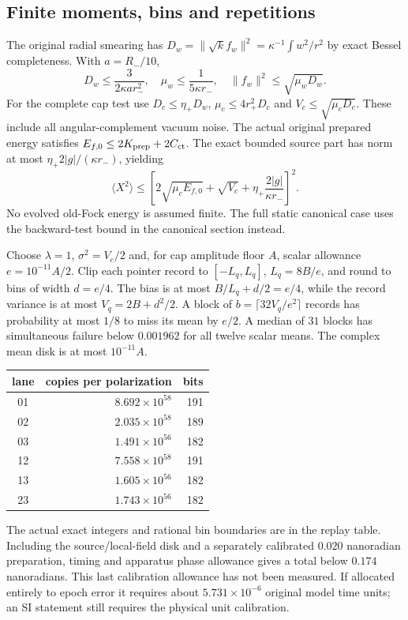 \subsection{Finite moments, bins and repetitions}
The original radial smearing has
$D_w=\|\sqrt{k}f_w\|^2=\kappa^{-1}\int w^2/r^2$
by exact Bessel completeness.  With $a=R_-/10$,
\begin{equation}
 D_w\leq\frac3{2\kappa a r_-^2},\quad
 \mu_w\leq\frac1{5\kappa r_-},\quad
 \|f_w\|^2\leq\sqrt{\mu_wD_w}.
\end{equation}
For the complete cap test use
$D_c\leq\eta_+D_w$, $\mu_c\leq4r_+^2D_c$ and
$V_c\leq\sqrt{\mu_cD_c}$.  These include all angular-complement
vacuum noise.  The actual original prepared energy satisfies
$E_{f,0}\leq2K_{\rm prep}+2C_{\rm ct}$.  The exact bounded source
part has norm at most $\eta_+2|g|/(\kappa r_-)$, yielding
\begin{equation}
 \langle X^2\rangle\leq
 \left[2\sqrt{\mu_cE_{f,0}}+\sqrt{V_c}
       +\eta_+\frac{2|g|}{\kappa r_-}\right]^2.
\end{equation}
No evolved old-Fock energy is assumed finite.  The full static canonical
case uses the backward-test bound in the canonical section instead.

Choose $\lambda=1$, $\sigma^2=V_c/2$ and, for cap amplitude floor
$A$, scalar allowance $e=10^{-11}A/2$.  Clip each pointer record to
$[-L_q,L_q]$, $L_q=8B/e$, and round to bins of width $d=e/4$.
The bias is at most $B/L_q+d/2=e/4$, while the record variance is at most
$V_q=2B+d^2/2$.  A block of $b=\lceil32V_q/e^2\rceil$ records has
probability at most $1/8$ to miss its mean by $e/2$.  A median of $31$
blocks has simultaneous failure below $0.001962$ for all twelve scalar
means.  The complex mean disk is at most $10^{-11}A$.

\begin{center}
\begin{tabular}{c|r|r}
lane & copies per polarization & bits\\\hline
01 & $8.692\times10^{58}$ & 191\\
02 & $2.035\times10^{58}$ & 189\\
03 & $1.491\times10^{56}$ & 182\\
12 & $7.558\times10^{58}$ & 191\\
13 & $1.605\times10^{56}$ & 182\\
23 & $1.743\times10^{56}$ & 182
\end{tabular}
\end{center}
The actual exact integers and rational bin boundaries are in the replay
table.  Including the source/local-field disk and a separately calibrated
$0.020$ nanoradian preparation, timing and apparatus phase allowance gives
a total below $0.174$ nanoradians.  This last calibration allowance has
not been measured.  If allocated entirely to epoch error it requires about
$5.731\times10^{-6}$ original model time units; an SI statement still
requires the physical unit calibration.

